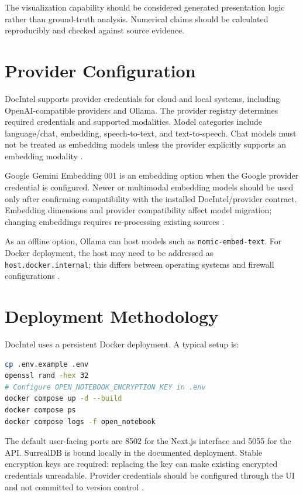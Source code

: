 \documentclass[conference]{IEEEtran}
\begin{document}
The visualization capability should be considered generated presentation logic rather than ground-truth analysis. Numerical claims should be calculated reproducibly and checked against source evidence.

\section{Provider Configuration}
DocIntel supports provider credentials for cloud and local systems, including OpenAI-compatible providers and Ollama. The provider registry determines required credentials and supported modalities. Model categories include language/chat, embedding, speech-to-text, and text-to-speech. Chat models must not be treated as embedding models unless the provider explicitly supports an embedding modality \cite{docintel,ollama}.

Google Gemini Embedding 001 is an embedding option when the Google provider credential is configured. Newer or multimodal embedding models should be used only after confirming compatibility with the installed DocIntel/provider contract. Embedding dimensions and provider compatibility affect model migration; changing embeddings requires re-processing existing sources \cite{googleembed}.

As an offline option, Ollama can host models such as \texttt{nomic-embed-text}. For Docker deployment, the host may need to be addressed as \texttt{host.docker.internal}; this differs between operating systems and firewall configurations \cite{ollama}.

\section{Deployment Methodology}
DocIntel uses a persistent Docker deployment. A typical setup is:
\begin{lstlisting}[language=bash,caption={Deployment commands},float=tb]
cp .env.example .env
openssl rand -hex 32
# Configure OPEN_NOTEBOOK_ENCRYPTION_KEY in .env
docker compose up -d --build
docker compose ps
docker compose logs -f open_notebook
\end{lstlisting}

The default user-facing ports are 8502 for the Next.js interface and 5055 for the API. SurrealDB is bound locally in the documented deployment. Stable encryption keys are required: replacing the key can make existing encrypted credentials unreadable. Provider credentials should be configured through the UI and not committed to version control \cite{docintel}.
\end{document}

